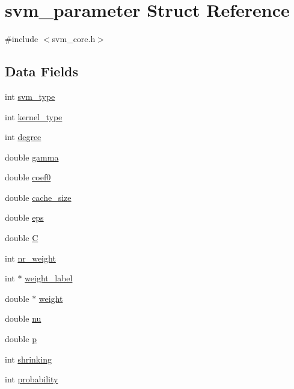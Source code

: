\hypertarget{structsvm__parameter}{}\section{svm\+\_\+parameter Struct Reference}
\label{structsvm__parameter}


{\ttfamily \#include $<$svm\+\_\+core.\+h$>$}

\subsection*{Data Fields}
\begin{DoxyCompactItemize}
\item 
int \hyperlink{structsvm__parameter_a3afb37272180a903df05f7b649b338f4}{svm\+\_\+type}
\item 
int \hyperlink{structsvm__parameter_a4188713ba31fc3d101244a6bcc09a760}{kernel\+\_\+type}
\item 
int \hyperlink{structsvm__parameter_afef1c4508ec0045c236a3308b0fa5138}{degree}
\item 
double \hyperlink{structsvm__parameter_a91667b90506e171482b5fc619377110d}{gamma}
\item 
double \hyperlink{structsvm__parameter_a3ab3555a96a578bea6e5285a5db0a4db}{coef0}
\item 
double \hyperlink{structsvm__parameter_a00286b7e0767e45d68ac7abceb60c821}{cache\+\_\+size}
\item 
double \hyperlink{structsvm__parameter_a1feab5a4e0d5842a20e544f3f944f841}{eps}
\item 
double \hyperlink{structsvm__parameter_af4f905a3f7d589d86964289af3c9d812}{C}
\item 
int \hyperlink{structsvm__parameter_a44014738d1db5444f7f9a1ebf74e4214}{nr\+\_\+weight}
\item 
int $\ast$ \hyperlink{structsvm__parameter_a06753922bb0282240f35ae7683f8d69a}{weight\+\_\+label}
\item 
double $\ast$ \hyperlink{structsvm__parameter_afff750f99180b5ddf735404496b6c196}{weight}
\item 
double \hyperlink{structsvm__parameter_a4c20c566cb61d5808e8cabd7adbc35c1}{nu}
\item 
double \hyperlink{structsvm__parameter_a3b60d7ce96137a64caca81095d1a188b}{p}
\item 
int \hyperlink{structsvm__parameter_afdbccdf6a24be650d75804b783edc347}{shrinking}
\item 
int \hyperlink{structsvm__parameter_afac0ef02879d7e27e17ac2a75115a7d9}{probability}
\end{DoxyCompactItemize}


